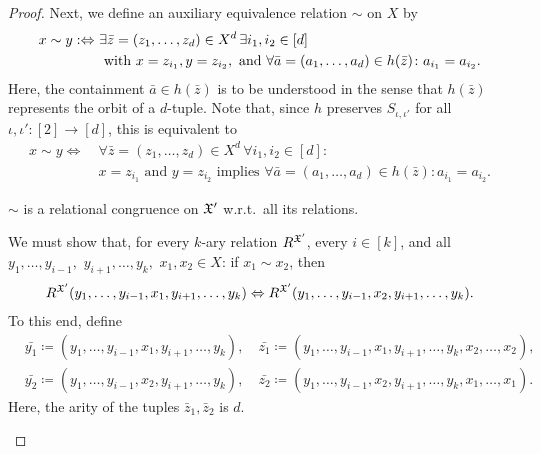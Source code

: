 \begin{proof}
        Next, we define an auxiliary equivalence relation $\sim$ on $X$ by 
        \begin{align*}
            x\sim y :\Leftrightarrow \ & \exists   \bar{z}=(z_1,\dots, z_d)\in X^d\,\exists i_1,i_2 \in [d]   \\ & \textnormal{ with } x=z_{i_1},y=z_{i_2}, \textnormal{ and }\forall\bar{a}=(a_1,\dots, a_d)\in h(\bar{z})\colon  a_{i_1}=a_{i_2}.
        \end{align*}
        Here, the containment $\bar{a} \in h(\bar{z})$ is to be understood in the sense that $h(\bar{z})$ represents the orbit of a $d$-tuple.
        Note that, since $h$ preserves $S_{\iota,\iota'}$  for all $\iota,\iota'\colon [2]\to[d]$, this is equivalent to
        \begin{align}
            x\sim y  \Leftrightarrow \ & \forall \bar{z}=(z_1,\dots, z_d)\in X^d\, \forall i_1,i_2 \in [d]\colon \nonumber \\ & x=z_{i_1} \text{ and } y=z_{i_2} \text{ implies } \forall\bar{a}=(a_1,\dots, a_d)\in h(\bar{z})\colon  a_{i_1}=a_{i_2}. \label{eq:reformulation} 
        \end{align}
        \begin{claim} \label{claim:congruence}
            $\sim$ is a relational congruence on $\mathfrak{X}'$ w.r.t.\ all its relations.
        \end{claim}
        \begin{claimproof}
            We must show that, for every $k$-ary relation $R^{\mathfrak{X}'}$, every $i\in [k]$, and all $ y_1,\dots,y_{i-1},$ $y_{i+1},\dots,y_k,$ $x_1,x_2\in X$: if  $x_1 \sim x_2$, then
         \begin{align*}
             R^{\mathfrak{X}'}(y_1,\dots,y_{i-1},x_1,y_{i+1},\dots,y_k)\Leftrightarrow R^{\mathfrak{X}'}(y_1,\dots,y_{i-1},x_2,y_{i+1},\dots,y_k) .
         \end{align*}
        To this end, define  
        \begin{align*}
            & \bar{y_1}  \coloneqq (y_1,\dots,y_{i-1},x_1,y_{i+1},\dots,y_k),  \quad\bar{z_1}  \coloneqq (y_1,\dots,y_{i-1},x_1,y_{i+1},\dots,y_k,x_2,\dots,x_2), \\ 
            &  \bar{y_2}  \coloneqq (y_1,\dots,y_{i-1},x_2,y_{i+1},\dots,y_k), \quad   
            \bar{z_2}  \coloneqq (y_1,\dots,y_{i-1},x_2,y_{i+1},\dots,y_k,x_1,\dots,x_1).  
        \end{align*}
        Here, the arity of the tuples $\bar{z}_1, \bar{z}_2$ is $d$.

\end{claimproof}
\end{proof}
